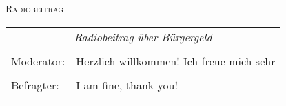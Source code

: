 \documentclass[11pt,a4paper]{article}
\begin{document}
	\textsc{Radiobeitrag}
	\begin{longtable}[c]{p{3cm}p{9cm}}\\
		\multicolumn{2}{c}{\textsl{Radiobeitrag über Bürgergeld}} \\\\
		Moderator: & Herzlich willkommen! Ich freue mich sehr \\\\
		Befragter: & I am fine, thank you!\\\\
	\end{longtable}
\end{document}
